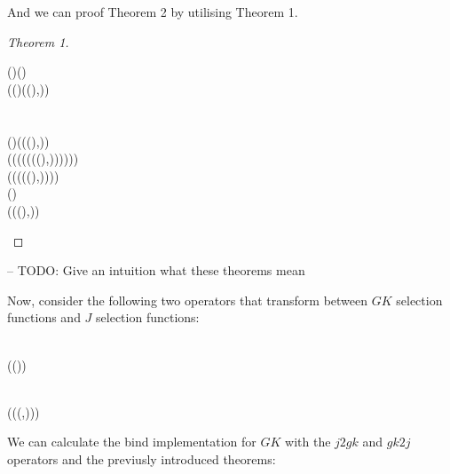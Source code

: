 And we can proof Theorem 2 by utilising Theorem 1.
\begin{proof}[Theorem 1]
\begin{hscode}\SaveRestoreHook
{}%
%
\>[B]{}(\mathbin{\circ})\;(\;){}\<[E]%
\\
\>[B]{}\mathrel{=}\;(\lambda {}\to (\mathbin{\circ})\;((\mathbin{\circ})\;,)){}\<[E]%
\\
\>[B]{}\mathrel{=}\;\<[E]%
\\[\blanklineskip]%
\>[B]{}\<[E]%
\\
\>[B]{}(\mathbin{\circ}\mathbin{\circ})\;(\lambda {}\to ((\mathbin{\circ})\;,)){}\<[E]%
\\
\>[B]{}\mathrel{=}\lambda {}\to (\;(\;(\;((\lambda {}\to ((\mathbin{\circ})\;,))\;)))){}\<[E]%
\\
\>[B]{}\mathrel{=}\lambda {}\to (\;(\;(\;((\mathbin{\circ})\;,)))){}\<[E]%
\\
\>[B]{}\mathrel{=}\lambda {}\to (\mathbin{\circ})\;\<[E]%
\\
\>[B]{}\mathrel{=}\mathbin{\circ}(\lambda {}\to ((\mathbin{\circ})\;,)){}\<[E]%
\ColumnHook
\end{hscode}\resethooks
\end{proof}

-- TODO: Give an intuition what these theorems mean

Now, consider the following two operators that transform between $GK$ selection functions
and $J$ selection functions:
\begin{hscode}\SaveRestoreHook
{}%
%
%
\>[3]{}\mathbin{::}\;\;\to {}\;\;\<[E]%
\\
\>[3]{}\;\;\mathrel{=}\;(\;(\mathbin{\circ})){}\<[E]%
\ColumnHook
\end{hscode}\resethooks
\begin{hscode}\SaveRestoreHook
{}%
%
%
\>[3]{}\mathbin{::}\;\;\to {}\;\;\<[E]%
\\
\>[3]{}\;\;\mathrel{=}\;(\;(\lambda {}\to (\;,))){}\<[E]%
\ColumnHook
\end{hscode}\resethooks
We can calculate the bind implementation for $GK$ with the $j2gk$ and $gk2j$ operators and 
the previusly introduced theorems:

